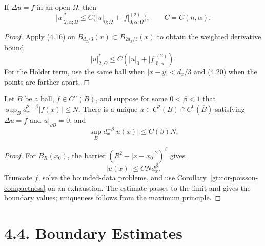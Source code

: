 \begin{theorem}\label{gt:thm-poisson-interior-weighted}
If $\Delta u=f$ in an open $\Omega$, then
\begin{equation}
\tag{4.19}
|u|^*_{2,\alpha;\Omega}
\leq C\bigl(|u|_{0;\Omega}+|f|^{(2)}_{0,\alpha;\Omega}\bigr),
\qquad C=C(n,\alpha).
\end{equation}
\end{theorem}
\begin{proof}
\sketch Apply (4.16) on
$B_{d_x/3}(x)\subset B_{2d_x/3}(x)$ to obtain the weighted derivative bound
\begin{equation}
\tag{4.20}
|u|^*_{2;\Omega}\leq C(|u|_0+|f|^{(2)}_{0,\alpha}).
\end{equation}
For the H\"older term, use the same ball when $|x-y|<d_x/3$ and (4.20)
when the points are farther apart.
\end{proof}

\begin{theorem}\label{gt:thm-poisson-ball-unbounded}
Let $B$ be a ball, $f\in C^\alpha(B)$, and suppose for some
$0<\beta<1$ that
$\sup_Bd_x^{2-\beta}|f(x)|\leq N$. There is a unique
$u\in C^2(B)\cap C^0(\overline B)$ satisfying $\Delta u=f$ and
$u|_{\partial B}=0$, and
\begin{equation}
\tag{4.21}
\sup_Bd_x^{-\beta}|u(x)|\leq C(\beta)N.
\end{equation}
\end{theorem}
\begin{proof}
\sketch For $B_R(x_0)$, the barrier
$(R^2-|x-x_0|^2)^\beta$ gives
\begin{equation}
\tag{4.22}
|u(x)|\leq C N d_x^\beta.
\end{equation}
Truncate $f$, solve the bounded-data problems, and use
Corollary~\ref{gt:cor-poisson-compactness} on an exhaustion. The estimate
passes to the limit and gives the boundary values; uniqueness follows from
the maximum principle.
\end{proof}

\section*{4.4. Boundary Estimates}

